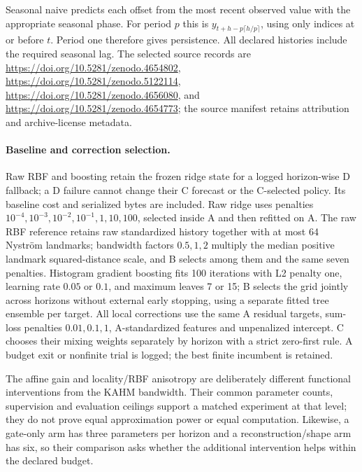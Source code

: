 Seasonal naive predicts each offset from the most recent observed value
with the appropriate seasonal phase. For period $p$ this is
$y_{t+h-p\lceil h/p\rceil}$, using only indices at or before $t$.
Period one therefore gives persistence. All declared histories include
the required seasonal lag. The selected source records are
\url{https://doi.org/10.5281/zenodo.4654802},
\url{https://doi.org/10.5281/zenodo.5122114},
\url{https://doi.org/10.5281/zenodo.4656080}, and
\url{https://doi.org/10.5281/zenodo.4654773}; the source manifest retains
attribution and archive-license metadata.

\paragraph{Baseline and correction selection.}
Raw RBF and boosting retain the frozen ridge state for a logged
horizon-wise D fallback; a D failure cannot change their C forecast or
the C-selected policy. Its baseline cost and serialized bytes are included.
Raw ridge uses penalties $10^{-4},10^{-3},10^{-2},10^{-1},1,10,100$,
selected inside A and then refitted on A. The raw RBF reference retains
raw standardized history together with at most 64 Nystr\"om landmarks;
bandwidth factors $0.5,1,2$ multiply the median positive landmark
squared-distance scale, and B selects among them and the same seven
penalties.
Histogram gradient boosting fits 100 iterations with L2 penalty one,
learning rate $0.05$ or $0.1$, and maximum leaves 7 or 15; B selects the
grid jointly across horizons without external early stopping, using
a separate fitted tree ensemble per target. All local corrections use the
same A residual targets, sum-loss penalties $0.01,0.1,1$, A-standardized
features and unpenalized intercept. C chooses their mixing weights
separately by horizon with a strict zero-first rule. A budget exit or
nonfinite trial is logged; the best finite incumbent is retained.

The affine gain and locality/RBF anisotropy are deliberately different
functional interventions from the KAHM bandwidth. Their common parameter
counts, supervision and evaluation ceilings support a matched experiment
at that level; they do not prove equal approximation power or equal
computation. Likewise, a gate-only arm has three parameters per horizon
and a reconstruction/shape arm has six, so their comparison asks whether
the additional intervention helps within the declared budget.


